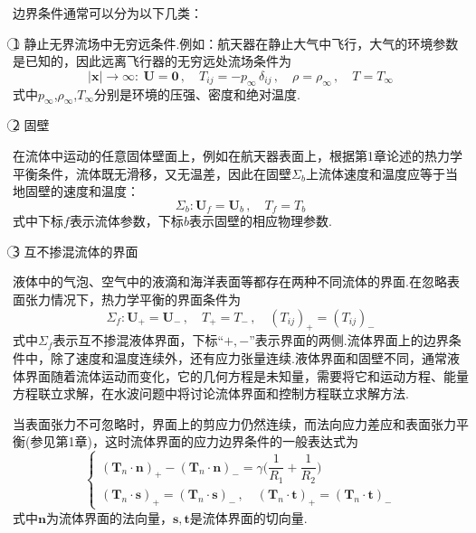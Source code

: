 边界条件通常可以分为以下几类：

\textcircled{1} 静止无界流场中无穷远条件.例如：航天器在静止大气中飞行，大气的环境参数是已知的，因此远离飞行器的无穷远处流场条件为
\begin{equation*}
|\boldsymbol{x}|\to\infty:\ \boldsymbol{U}=\boldsymbol{0}\,,\quad T_{ij}=-p_\infty\,\delta_{ij}\,,\quad \rho=\rho_\infty\,,\quad T=T_\infty
\tag{3.35}
\end{equation*}
式中$p_\infty$,$\rho_\infty$,$T_\infty$分别是环境的压强、密度和绝对温度.

\textcircled{2} 固壁

在流体中运动的任意固体壁面上，例如在航天器表面上，根据第1章论述的热力学平衡条件，流体既无滑移，又无温差，因此在固壁$\Sigma_b$上流体速度和温度应等于当地固壁的速度和温度：
\begin{equation*}
\Sigma_b:\boldsymbol{U}_f=\boldsymbol{U}_b\,,\quad T_f=T_b
\tag{3.36}
\end{equation*}
式中下标$f$表示流体参数，下标$b$表示固壁的相应物理参数.

\textcircled{3} 互不掺混流体的界面

液体中的气泡、空气中的液滴和海洋表面等都存在两种不同流体的界面.在忽略表面张力情况下，热力学平衡的界面条件为
\begin{equation*}
\Sigma_f:\boldsymbol{U}_{+}=\boldsymbol{U}_{-}\,,\quad T_{+}=T_{-}\,,\quad (T_{ij})_{+}=(T_{ij})_{-}
\tag{3.37}
\end{equation*}
式中$\Sigma_f$表示互不掺混液体界面，下标“$+,-$”表示界面的两侧.流体界面上的边界条件中，除了速度和温度连续外，还有应力张量连续.液体界面和固壁不同，通常液体界面随着流体运动而变化，它的几何方程是未知量，需要将它和运动方程、能量方程联立求解，在水波问题中将讨论流体界面和控制方程联立求解方法.

当表面张力不可忽略时，界面上的剪应力仍然连续，而法向应力差应和表面张力平衡(参见第1章)，这时流体界面的应力边界条件的一般表达式为
\begin{equation*}
\begin{cases}
(\boldsymbol{T}_n\cdot\boldsymbol{n})_{+}-(\boldsymbol{T}_n\cdot\boldsymbol{n})_{-}=\gamma\Big(\dfrac{1}{R_1}+\dfrac{1}{R_2}\Big)\\[8pt]
(\boldsymbol{T}_n\cdot\boldsymbol{s})_{+}=(\boldsymbol{T}_n\cdot\boldsymbol{s})_{-}\,,\quad (\boldsymbol{T}_n\cdot\boldsymbol{t})_{+}=(\boldsymbol{T}_n\cdot\boldsymbol{t})_{-}
\end{cases}
\tag{3.38}
\end{equation*}
式中$\boldsymbol{n}$为流体界面的法向量，$\boldsymbol{s},\boldsymbol{t}$是流体界面的切向量.

